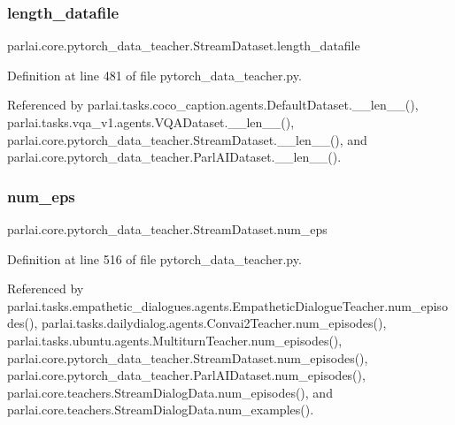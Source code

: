 \subsubsection{\texorpdfstring{length\+\_\+datafile}{length\_datafile}}
{\footnotesize\ttfamily parlai.\+core.\+pytorch\+\_\+data\+\_\+teacher.\+Stream\+Dataset.\+length\+\_\+datafile}



Definition at line 481 of file pytorch\+\_\+data\+\_\+teacher.\+py.



Referenced by parlai.\+tasks.\+coco\+\_\+caption.\+agents.\+Default\+Dataset.\+\_\+\+\_\+len\+\_\+\+\_\+(), parlai.\+tasks.\+vqa\+\_\+v1.\+agents.\+V\+Q\+A\+Dataset.\+\_\+\+\_\+len\+\_\+\+\_\+(), parlai.\+core.\+pytorch\+\_\+data\+\_\+teacher.\+Stream\+Dataset.\+\_\+\+\_\+len\+\_\+\+\_\+(), and parlai.\+core.\+pytorch\+\_\+data\+\_\+teacher.\+Parl\+A\+I\+Dataset.\+\_\+\+\_\+len\+\_\+\+\_\+().

\mbox{\label{classparlai_1_1core_1_1pytorch__data__teacher_1_1StreamDataset_ae9315b97e4ba810e58fe1ccfedd38b98}} 
\subsubsection{\texorpdfstring{num\+\_\+eps}{num\_eps}}
{\footnotesize\ttfamily parlai.\+core.\+pytorch\+\_\+data\+\_\+teacher.\+Stream\+Dataset.\+num\+\_\+eps}



Definition at line 516 of file pytorch\+\_\+data\+\_\+teacher.\+py.



Referenced by parlai.\+tasks.\+empathetic\+\_\+dialogues.\+agents.\+Empathetic\+Dialogue\+Teacher.\+num\+\_\+episodes(), parlai.\+tasks.\+dailydialog.\+agents.\+Convai2\+Teacher.\+num\+\_\+episodes(), parlai.\+tasks.\+ubuntu.\+agents.\+Multiturn\+Teacher.\+num\+\_\+episodes(), parlai.\+core.\+pytorch\+\_\+data\+\_\+teacher.\+Stream\+Dataset.\+num\+\_\+episodes(), parlai.\+core.\+pytorch\+\_\+data\+\_\+teacher.\+Parl\+A\+I\+Dataset.\+num\+\_\+episodes(), parlai.\+core.\+teachers.\+Stream\+Dialog\+Data.\+num\+\_\+episodes(), and parlai.\+core.\+teachers.\+Stream\+Dialog\+Data.\+num\+\_\+examples().

